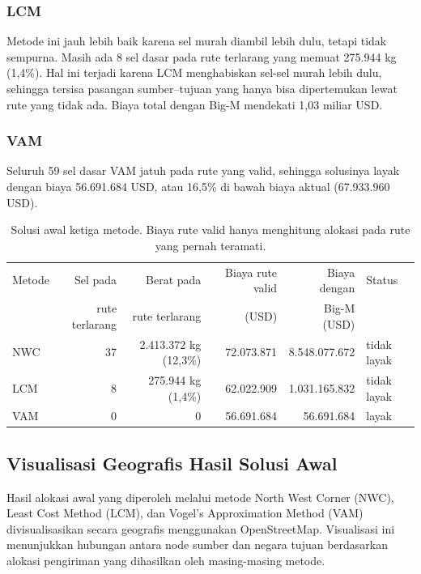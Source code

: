 \documentclass[a4paper,11pt]{article}
\begin{document}
\subsubsection{LCM}
Metode ini jauh lebih baik karena sel murah diambil lebih dulu, tetapi tidak sempurna. Masih ada 8 sel dasar pada rute terlarang yang memuat 275.944 kg (1,4\%). Hal ini terjadi karena LCM menghabiskan sel-sel murah lebih dulu, sehingga tersisa pasangan sumber--tujuan yang hanya bisa dipertemukan lewat rute yang tidak ada. Biaya total dengan Big-M mendekati 1,03 miliar USD.

\subsubsection{VAM}
Seluruh 59 sel dasar VAM jatuh pada rute yang valid, sehingga solusinya layak dengan biaya 56.691.684 USD, atau 16,5\% di bawah biaya aktual (67.933.960 USD).

\begin{table}[htbp]
\centering
\caption{Solusi awal ketiga metode. Biaya rute valid hanya menghitung alokasi pada rute yang pernah teramati.}\label{tab:awal}
\small
\begin{tabular}{@{}l r r r r l@{}}
\toprule
Metode & Sel pada & Berat pada & Biaya rute valid & Biaya dengan & Status \\
 & rute terlarang & rute terlarang & (USD) & Big-M (USD) & \\
\midrule
NWC & 37 & 2.413.372 kg (12,3\%) & 72.073.871 & 8.548.077.672 & tidak layak \\
LCM & 8 & 275.944 kg (1,4\%) & 62.022.909 & 1.031.165.832 & tidak layak \\
VAM & 0 & 0 & 56.691.684 & 56.691.684 & layak \\
\bottomrule
\end{tabular}
\end{table}

\subsection{Visualisasi Geografis Hasil Solusi Awal}

Hasil alokasi awal yang diperoleh melalui metode North West Corner
(NWC), Least Cost Method (LCM), dan Vogel's Approximation Method
(VAM) divisualisasikan secara geografis menggunakan OpenStreetMap.
Visualisasi ini menunjukkan hubungan antara node sumber dan negara
tujuan berdasarkan alokasi pengiriman yang dihasilkan oleh masing-masing
metode.
\end{document}
